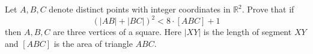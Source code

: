 Let $A, B, C$ denote distinct points with integer coordinates in $\mathbb
R^2$.  Prove that if
\[(|AB|+|BC|)^2<8\cdot [ABC]+1\]
then $A, B, C$ are three vertices of a square.  Here $|XY|$ is the length
of segment $XY$ and $[ABC]$ is the area of triangle $ABC$.
